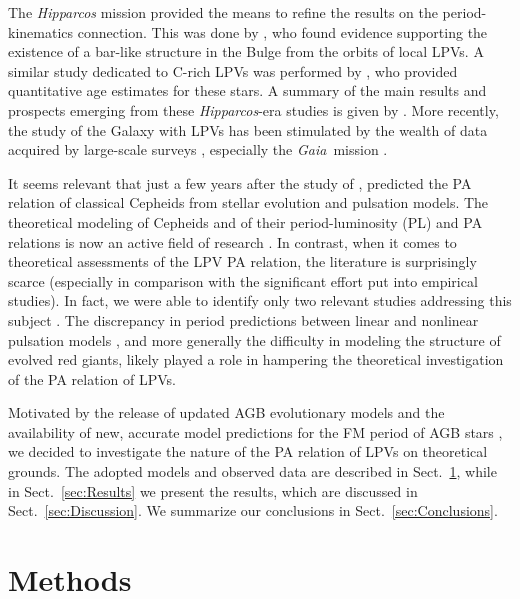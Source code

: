 \documentclass[letter]{aa}
\newcommand{\gaia}{\textit{Gaia}}
\begin{document}
The \textit{Hipparcos} mission provided the means to refine the results on the period-kinematics connection. This was done by \citet{FeastWhitelock_2000}, who found evidence supporting the existence of a bar-like structure in the Bulge from the orbits of local LPVs. A similar study dedicated to C-rich LPVs was performed by \citet{Feast_etal_2006}, who provided quantitative age estimates for these stars. A summary of the main results and prospects emerging from these \textit{Hipparcos}-era studies is given by \citet{Feast_2007}. More recently, the study of the Galaxy with LPVs has been stimulated by the wealth of data acquired by large-scale surveys \citep[e.g.,][]{Catchpole_etal_2016,Urago_etal_2020}, especially the \gaia\ mission \citep{Grady_etal_2019,Grady_etal_2020}.

It seems relevant that just a few years after the study of \citet{Feast_1963}, \citet{KippenhahnSmith_1969} predicted the PA relation of classical Cepheids from stellar evolution and pulsation models. The theoretical modeling of Cepheids and of their period-luminosity (PL) and PA relations is now an active field of research \citep[e.g.,][]{Bono_etal_2005,Anderson_etal_2016,DeSomma_etal_2020}. In contrast, when it comes to theoretical assessments of the LPV PA relation, the literature is surprisingly scarce (especially in comparison with the significant effort put into empirical studies). In fact, we were able to identify only two relevant studies addressing this subject \citep{WyattCahn_1983,Eggen_1998}. The discrepancy in period predictions between linear and nonlinear pulsation models \citep[e.g.,][]{YaAriTuchman_1996,Lebzelter_Wood_2005,Trabucchi_etal_2021}, and more generally the difficulty in modeling the structure of evolved red giants, likely played a role in hampering the theoretical investigation of the PA relation of LPVs.

Motivated by the release of updated AGB evolutionary models \citep{Pastorelli_etal_2019,Pastorelli_etal_2020} and the availability of new, accurate model predictions for the FM period of AGB stars \citep{Trabucchi_etal_2019,Trabucchi_etal_2021}, we decided to investigate the nature of the PA relation of LPVs on theoretical grounds. The adopted models and observed data are described in Sect.~\ref{sec:Methods}, while in Sect.~\ref{sec:Results} we present the results, which are discussed in Sect.~\ref{sec:Discussion}. We summarize our conclusions in Sect.~\ref{sec:Conclusions}.

\section{Methods}
\label{sec:Methods}
\end{document}
